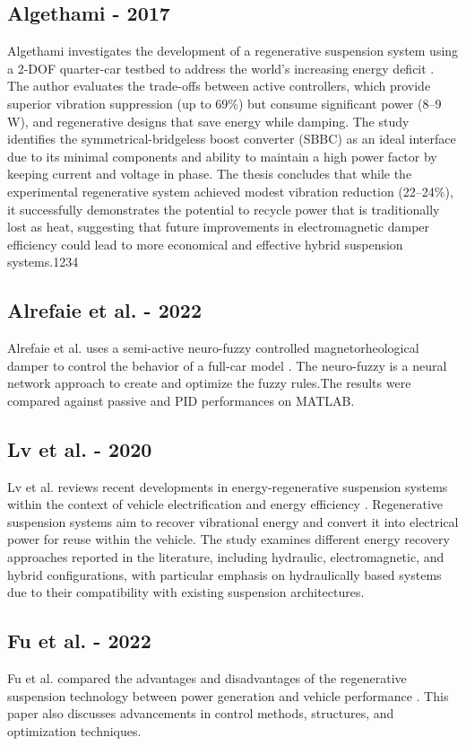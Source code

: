 \subsection{Algethami - 2017}
Algethami investigates the development of a regenerative suspension system using a 2-DOF quarter-car testbed to address the world's increasing energy deficit \cite{algethami2017regenerative}. The author evaluates the trade-offs between active controllers, which provide superior vibration suppression (up to 69\%) but consume significant power (8–9 W), and regenerative designs that save energy while damping. The study identifies the symmetrical-bridgeless boost converter (SBBC) as an ideal interface due to its minimal components and ability to maintain a high power factor by keeping current and voltage in phase. The thesis concludes that while the experimental regenerative system achieved modest vibration reduction (22–24\%), it successfully demonstrates the potential to recycle power that is traditionally lost as heat, suggesting that future improvements in electromagnetic damper efficiency could lead to more economical and effective hybrid suspension systems.1234

 \subsection{Alrefaie et al. - 2022}
  Alrefaie et al. uses a semi-active neuro-fuzzy controlled magnetorheological damper to control the behavior of a full-car model \cite{alrefaie2022semi}. The neuro-fuzzy is a neural network approach to create and optimize the fuzzy rules.The results were compared against passive and PID performances on MATLAB.
  
  \subsection{Lv et al. - 2020}
  Lv et al. reviews recent developments in energy-regenerative suspension systems within the context of vehicle electrification and energy efficiency \cite{lv2020research}. Regenerative suspension systems aim to recover vibrational energy and convert it into electrical power for reuse within the vehicle. The study examines different energy recovery approaches reported in the literature, including hydraulic, electromagnetic, and hybrid configurations, with particular emphasis on hydraulically based systems due to their compatibility with existing suspension architectures.
  
   \subsection{Fu et al. - 2022}
   Fu et al. compared the advantages and disadvantages of the regenerative suspension technology between power generation and vehicle performance \cite{fu2023review}. This paper also discusses advancements in control methods, structures, and optimization techniques.


